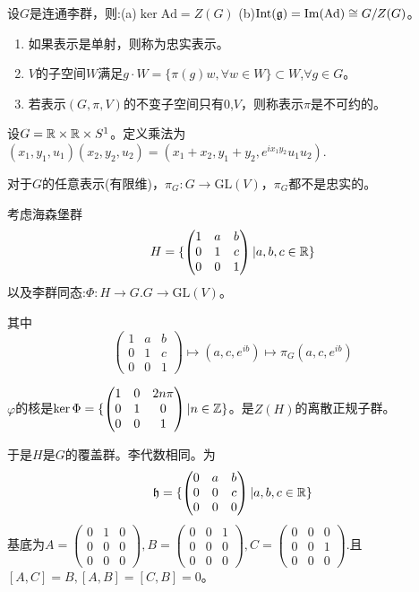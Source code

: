 \begin{proposition}
    设$G$是连通李群，则:(a)$\ker \mathrm{Ad}=Z(G)$ (b)$\mathrm{Int}(\mathfrak{g})= \mathrm{Im}(\mathrm{Ad}) \cong G/Z(G)$。
\end{proposition}

\begin{definition}
    \begin{enumerate}
        \item 如果表示是单射，则称为忠实表示。
        \item $V$的子空间$W$满足$g \cdot W=\{\pi(g)w, \forall w \in W\} \subset W$,$\forall g \in G$。
        \item 若表示$(G,\pi,V)$的不变子空间只有$0$,$V$，则称表示$\pi$是不可约的。
    \end{enumerate}
\end{definition}
\begin{example}[非矩阵李群]
    设$G=\mathbb{R} \times \mathbb{R} \times S^1$。定义乘法为$(x_1,y_1,u_1)(x_2,y_2,u_2)=(x_1+x_2,y_1+y_2,e^{ix_1y_2}u_1u_2)$.

    对于$G$的任意表示(有限维)，$\pi_G:G \to \mathrm{GL}(V)$，$\pi_G$都不是忠实的。

    考虑海森堡群$$
    H=\{\begin{pmatrix}
        1&a&b\\0&1&c\\0&0&1
    \end{pmatrix}|a,b,c\in \mathbb{R}\}$$
    以及李群同态:$\Phi:H \to G$.$G \to \mathrm{GL}(V)$。

    其中
    $$
    \begin{pmatrix}
        1&a&b\\0&1&c\\0&0&1
    \end{pmatrix} \mapsto (a,c,e^{ib}) \mapsto \pi_G(a,c,e^{ib})
    $$

    $\varphi$的核是$\ker \Phi=\{\begin{pmatrix}
        1&0&2n \pi\\0&1&0\\0&0&1
    \end{pmatrix}|n \in  \mathbb{Z}\}$。是$Z(H)$的离散正规子群。

    于是$H$是$G$的覆盖群。李代数相同。为
    $$
    \mathfrak{h}=\{\begin{pmatrix}
        0&a&b\\0&0&c\\0&0&0
    \end{pmatrix}|a,b,c \in \mathbb{R}\}
    $$
    基底为$A=\begin{pmatrix}
        0&1&0\\0&0&0\\0&0&0
    \end{pmatrix},B=\begin{pmatrix}
        0&0&1\\0&0&0\\0&0&0
    \end{pmatrix},C=\begin{pmatrix}
        0&0&0\\0&0&1\\0&0&0
    \end{pmatrix}$.且$[A,C]=B,[A,B]=[C,B]=0$。
\end{example}
